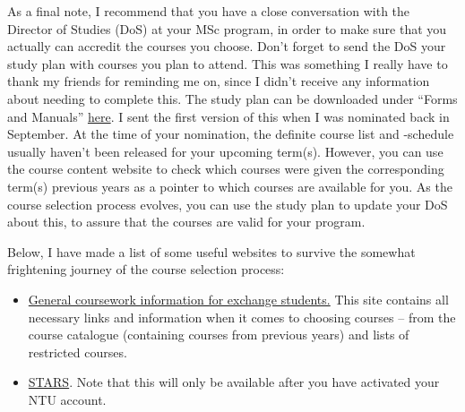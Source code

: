 As a final note, I recommend that you have a close conversation with the Director of Studies (DoS) at your MSc program, in order to make sure that you actually can accredit the courses you choose. Don't forget to send the DoS your study plan with courses you plan to attend. This was something I really have to thank my friends for reminding me on, since I didn't receive any information about needing to complete this. The study plan can be downloaded under ``Forms and Manuals'' \href{https://www.chalmers.se/en/education/your-studies/exchange-studies-and-international-opportunities/exchange-studies/preparing-for-exchange-studies/}{here}. I sent the first version of this when I was nominated back in September. At the time of your nomination, the definite course list and -schedule usually haven't been released for your upcoming term(s). However, you can use the course content website to check which courses were given the corresponding term(s) previous years as a pointer to which courses are available for you. As the course selection process evolves, you can use the study plan to update your DoS about this, to assure that the courses are valid for your program.

\hrulefill

Below, I have made a list of some useful websites to survive the somewhat frightening journey of the course selection process:
\begin{itemize}
    \item \href{https://gem.ntu.edu.sg/index.cfm?FuseAction=Programs.ViewProgramAngular&id=10006}{General coursework information for exchange students.} This site contains all necessary links and information when it comes to choosing courses -- from the course catalogue (containing courses from previous years) and lists of restricted courses.
    \item \href{https://wish.wis.ntu.edu.sg/pls/webexe/ldap_login.login?w_url=https://wish.wis.ntu.edu.sg/pls/webexe/aus_stars_planner.main}{STARS}. Note that this will only be available after you have activated your NTU account. 
\end{itemize}
